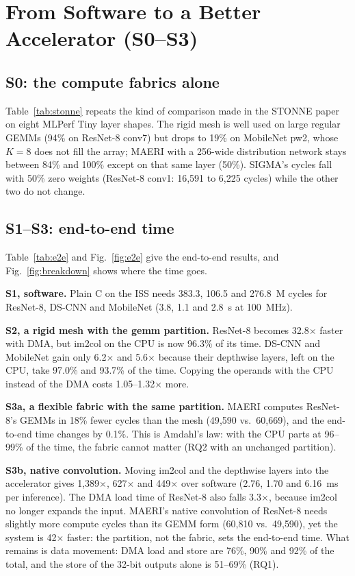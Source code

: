\documentclass[conference]{IEEEtran}
\begin{document}


\section{From Software to a Better Accelerator (S0--S3)}
\subsection{S0: the compute fabrics alone}
Table~\ref{tab:stonne} repeats the kind of comparison made in the STONNE paper on eight MLPerf Tiny layer shapes. The rigid mesh is well used on large regular GEMMs (94\% on ResNet-8 conv7) but drops to 19\% on MobileNet pw2, whose $K=8$ does not fill the array; MAERI with a 256-wide distribution network stays between 84\% and 100\% except on that same layer (50\%). SIGMA's cycles fall with 50\% zero weights (ResNet-8 conv1: 16{,}591 to 6{,}225 cycles) while the other two do not change.



\subsection{S1--S3: end-to-end time}
Table~\ref{tab:e2e} and Fig.~\ref{fig:e2e} give the end-to-end results, and Fig.~\ref{fig:breakdown} shows where the time goes.

\textbf{S1, software.} Plain C on the ISS needs 383.3, 106.5 and 276.8~M cycles for ResNet-8, DS-CNN and MobileNet (3.8, 1.1 and 2.8~s at 100~MHz).

\textbf{S2, a rigid mesh with the gemm partition.} ResNet-8 becomes 32.8$\times$ faster with DMA, but im2col on the CPU is now 96.3\% of its time. DS-CNN and MobileNet gain only 6.2$\times$ and 5.6$\times$ because their depthwise layers, left on the CPU, take 97.0\% and 93.7\% of the time. Copying the operands with the CPU instead of the DMA costs 1.05--1.32$\times$ more.

\textbf{S3a, a flexible fabric with the same partition.} MAERI computes ResNet-8's GEMMs in 18\% fewer cycles than the mesh (49{,}590 vs.\ 60{,}669), and the end-to-end time changes by 0.1\%. This is Amdahl's law: with the CPU parts at 96--99\% of the time, the fabric cannot matter (RQ2 with an unchanged partition).

\textbf{S3b, native convolution.} Moving im2col and the depthwise layers into the accelerator gives 1{,}389$\times$, 627$\times$ and 449$\times$ over software (2.76, 1.70 and 6.16~ms per inference). The DMA load time of ResNet-8 also falls 3.3$\times$, because im2col no longer expands the input. MAERI's native convolution of ResNet-8 needs slightly more compute cycles than its GEMM form (60{,}810 vs.\ 49{,}590), yet the system is 42$\times$ faster: the partition, not the fabric, sets the end-to-end time. What remains is data movement: DMA load and store are 76\%, 90\% and 92\% of the total, and the store of the 32-bit outputs alone is 51--69\% (RQ1).
\end{document}
